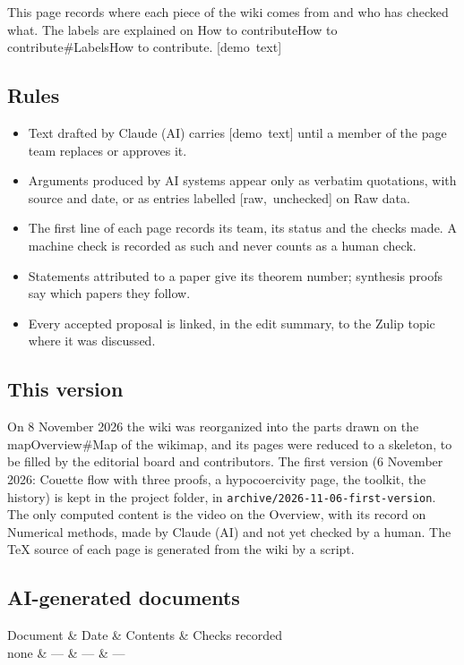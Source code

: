\documentclass[11pt]{article}
\makeatletter
\theoremstyle{definition}
\theoremstyle{remark}
\newcommand{\ed@label}[1]{\mbox{\footnotesize[#1]}}
\newcommand{\demo}[1]{\ed@label{demo text}}
\newcommand{\raw}[1]{\ed@label{raw, unchecked}}
\newcommand{\wikilink}[2]{\ifx\relax#2\relax#1\else#2\fi}
\newenvironment{wikitable}[1]{\par\smallskip\noindent\tabularx{\linewidth}{|*{#1}{>{\raggedright\arraybackslash}X|}}\hline}{\endtabularx\par\smallskip}
\newcommand{\header}[1]{#1\\\hline\hline}
\newcommand{\row}[1]{#1\\\hline}
\makeatother
\begin{document}
This page records where each piece of the wiki comes from and who has checked what. The labels are explained on \wikilink{How to contribute\#Labels}{How to contribute}. \demo{}

\subsection{Rules}
\begin{itemize}
  \item Text drafted by Claude (AI) carries \demo{} until a member of the page team replaces or approves it.
  \item Arguments produced by AI systems appear only as verbatim quotations, with source and date, or as entries labelled \raw{} on \wikilink{Raw data}{}.
  \item The first line of each page records its team, its status and the checks made. A machine check is recorded as such and never counts as a human check.
  \item Statements attributed to a paper give its theorem number; synthesis proofs say which papers they follow.
  \item Every accepted proposal is linked, in the edit summary, to the Zulip topic where it was discussed.
\end{itemize}

\subsection{This version}
On 8 November 2026 the wiki was reorganized into the parts drawn on the \wikilink{Overview\#Map of the wiki}{map}, and its pages were reduced to a skeleton, to be filled by the editorial board and contributors. The first version (6 November 2026: Couette flow with three proofs, a hypocoercivity page, the toolkit, the history) is kept in the project folder, in \texttt{archive/2026-11-06-first-version}. The only computed content is the video on the Overview, with its record on \wikilink{Numerical methods}{}, made by Claude (AI) and not yet checked by a human. The TeX source of each page is generated from the wiki by a script.

\subsection{AI-generated documents}
\begin{wikitable}{4}
\header{Document & Date & Contents & Checks recorded}
\row{none & — & — & —}
\end{wikitable}
\end{document}
